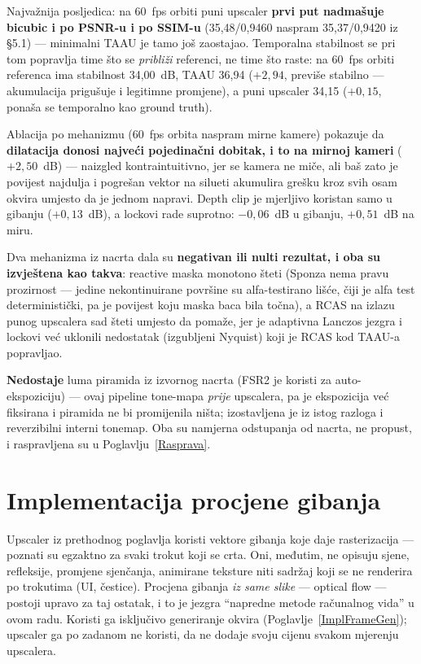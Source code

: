 \documentclass{mathos}
\begin{document}
Najvažnija posljedica: na 60~fps orbiti puni upscaler \textbf{prvi put
nadmašuje bicubic i po PSNR-u i po SSIM-u} (35,48/0,9460 naspram
35,37/0,9420 iz \S 5.1) — minimalni TAAU je tamo još zaostajao. Temporalna
stabilnost se pri tom popravlja time što se \emph{približi} referenci, ne
time što raste: na 60~fps orbiti referenca ima stabilnost 34,00~dB, TAAU
36,94 ($+2,94$, previše stabilno — akumulacija prigušuje i legitimne
promjene), a puni upscaler 34,15 ($+0,15$, ponaša se temporalno kao ground
truth).

Ablacija po mehanizmu (60~fps orbita naspram mirne kamere) pokazuje da
\textbf{dilatacija donosi najveći pojedinačni dobitak, i to na mirnoj kameri}
($+2,50$~dB) — naizgled kontraintuitivno, jer se kamera ne miče, ali baš zato
je povijest najdulja i pogrešan vektor na silueti akumulira grešku kroz svih
osam okvira umjesto da je jednom napravi. Depth clip je mjerljivo koristan
samo u gibanju ($+0,13$~dB), a lockovi rade suprotno: $-0,06$~dB u gibanju,
$+0,51$~dB na miru.

Dva mehanizma iz nacrta dala su \textbf{negativan ili nulti rezultat, i oba
su izvještena kao takva}: reactive maska monotono šteti (Sponza nema pravu
prozirnost — jedine nekontinuirane površine su alfa-testirano lišće, čiji je
alfa test deterministički, pa je povijest koju maska baca bila točna), a
RCAS na izlazu punog upscalera sad šteti umjesto da pomaže, jer je
adaptivna Lanczos jezgra i lockovi već uklonili nedostatak (izgubljeni
Nyquist) koji je RCAS kod TAAU-a popravljao.

\textbf{Nedostaje} luma piramida iz izvornog nacrta (FSR2 je koristi za
auto-ekspoziciju) — ovaj pipeline tone-mapa \emph{prije} upscalera, pa je
ekspozicija već fiksirana i piramida ne bi promijenila ništa; izostavljena
je iz istog razloga i reverzibilni interni tonemap. Oba su namjerna
odstupanja od nacrta, ne propust, i raspravljena su u
Poglavlju~\ref{Rasprava}.


\chapter{Implementacija procjene gibanja}\label{ImplOpticalFlow}

Upscaler iz prethodnog poglavlja koristi vektore gibanja koje daje
rasterizacija — poznati su egzaktno za svaki trokut koji se crta. Oni,
međutim, ne opisuju sjene, refleksije, promjene sjenčanja, animirane
teksture niti sadržaj koji se ne renderira po trokutima (UI, čestice).
Procjena gibanja \emph{iz same slike} — optical flow — postoji upravo za taj
ostatak, i to je jezgra ``napredne metode računalnog vida'' u ovom radu.
Koristi ga isključivo generiranje okvira (Poglavlje~\ref{ImplFrameGen});
upscaler ga po zadanom ne koristi, da ne dodaje svoju cijenu svakom
mjerenju upscalera.
\end{document}
